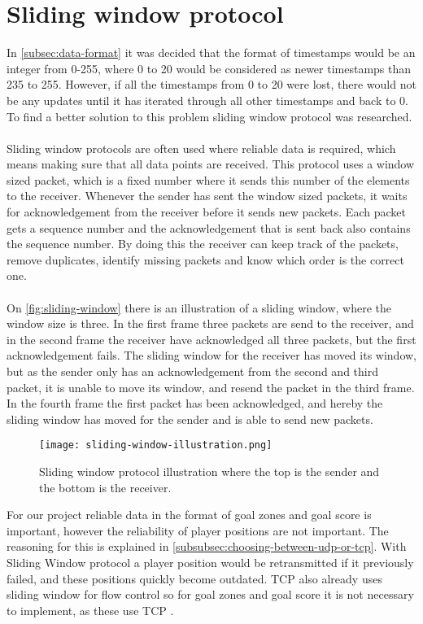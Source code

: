 \section{Sliding window protocol}
In \autoref{subsec:data-format} it was decided that the format of timestamps would be an integer from 0-255, where 0 to 20 would be considered as newer timestamps than 235 to 255.
However, if all the timestamps from 0 to 20 were lost, there would not be any updates until it has iterated through all other timestamps and back to 0.
To find a better solution to this problem sliding window protocol was researched.
\\\\
Sliding window protocols are often used where reliable data is required, which means making sure that all data points are received.
This protocol uses a window sized packet, which is a fixed number where it sends this number of the elements to the receiver.
Whenever the sender has sent the window sized packets, it waits for acknowledgement from the receiver before it sends new packets.
Each packet gets a sequence number and the acknowledgement that is sent back also contains the sequence number.
By doing this the receiver can keep track of the packets, remove duplicates, identify missing packets and know which order is the correct one.
\\\\
On \autoref{fig:sliding-window} there is an illustration of a sliding window, where the window size is three.
In the first frame three packets are send to the receiver, and in the second frame the receiver have acknowledged all three packets, but the first acknowledgement fails.
The sliding window for the receiver has moved its window, but as the sender only has an acknowledgement from the second and third packet, it is unable to move its window, and resend the packet in the third frame.
In the fourth frame the first packet has been acknowledged, and hereby the sliding window has moved for the sender and is able to send new packets.
\begin{figure}[H]
    \centering
    \texttt{[image: sliding-window-illustration.png]}
    \caption{Sliding window protocol illustration where the top is the sender and the bottom is the receiver.}
    \label{fig:sliding-window}
\end{figure}
\noindent
For our project reliable data in the format of goal zones and goal score is important, however the reliability of player positions are not important.
The reasoning for this is explained in \autoref{subsubsec:choosing-between-udp-or-tcp}.
With Sliding Window protocol a player position would be retransmitted if it previously failed, and these positions quickly become outdated.
TCP also already uses sliding window for flow control so for goal zones and goal score it is not necessary to implement, as these use TCP \cite{ibm:sliding-window}.

